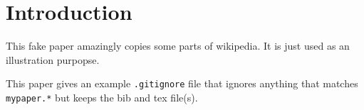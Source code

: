 \section{Introduction}
\label{sec:intro}

This fake paper amazingly copies some parts of wikipedia.
It is just used as an illustration purpopse.

This paper gives an example {\tt .gitignore} file that ignores anything that matches {\tt mypaper.*} but keeps the bib and tex file(s).

